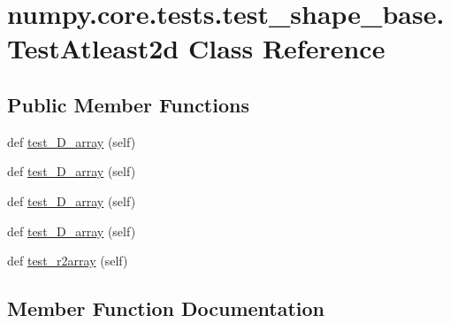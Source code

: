 \hypertarget{classnumpy_1_1core_1_1tests_1_1test__shape__base_1_1TestAtleast2d}{}\section{numpy.\+core.\+tests.\+test\+\_\+shape\+\_\+base.\+Test\+Atleast2d Class Reference}
\label{classnumpy_1_1core_1_1tests_1_1test__shape__base_1_1TestAtleast2d}
\subsection*{Public Member Functions}
\begin{DoxyCompactItemize}
\item 
def \hyperlink{classnumpy_1_1core_1_1tests_1_1test__shape__base_1_1TestAtleast2d_a851548c50e84b7ae7edc950bad517597}{test\+\_\+D\+\_\+array} (self)
\item 
def \hyperlink{classnumpy_1_1core_1_1tests_1_1test__shape__base_1_1TestAtleast2d_a27e3d5e84c33306376bfb49fc4e3b20b}{test\+\_\+D\+\_\+array} (self)
\item 
def \hyperlink{classnumpy_1_1core_1_1tests_1_1test__shape__base_1_1TestAtleast2d_a0ca690b455516ba8f6dcdfac03d3335f}{test\+\_\+D\+\_\+array} (self)
\item 
def \hyperlink{classnumpy_1_1core_1_1tests_1_1test__shape__base_1_1TestAtleast2d_a0392b4894b97d834dfd5755474d81fdf}{test\+\_\+D\+\_\+array} (self)
\item 
def \hyperlink{classnumpy_1_1core_1_1tests_1_1test__shape__base_1_1TestAtleast2d_ae47040c25fa3c468661be255eeb72b4a}{test\+\_\+r2array} (self)
\end{DoxyCompactItemize}


\subsection{Member Function Documentation}
\mbox{\label{classnumpy_1_1core_1_1tests_1_1test__shape__base_1_1TestAtleast2d_a851548c50e84b7ae7edc950bad517597}} 
